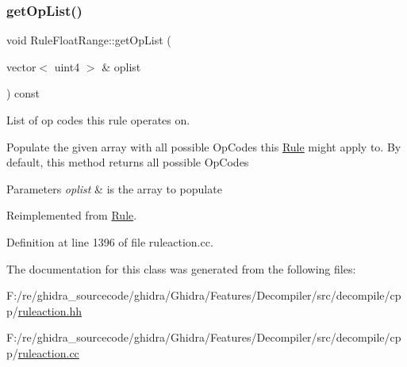 \subsubsection{\texorpdfstring{getOpList()}{getOpList()}}
{\footnotesize\ttfamily void Rule\+Float\+Range\+::get\+Op\+List (\begin{DoxyParamCaption}\item[{vector$<$ uint4 $>$ \&}]{oplist }\end{DoxyParamCaption}) const\hspace{0.3cm}{\ttfamily [virtual]}}



List of op codes this rule operates on. 

Populate the given array with all possible Op\+Codes this \mbox{\hyperlink{class_rule}{Rule}} might apply to. By default, this method returns all possible Op\+Codes 
\begin{DoxyParams}{Parameters}
{\em oplist} & is the array to populate \\
\hline
\end{DoxyParams}


Reimplemented from \mbox{\hyperlink{class_rule_a4023bfc7825de0ab866790551856d10e}{Rule}}.



Definition at line 1396 of file ruleaction.\+cc.



The documentation for this class was generated from the following files\+:\begin{DoxyCompactItemize}
\item 
F\+:/re/ghidra\+\_\+sourcecode/ghidra/\+Ghidra/\+Features/\+Decompiler/src/decompile/cpp/\mbox{\hyperlink{ruleaction_8hh}{ruleaction.\+hh}}\item 
F\+:/re/ghidra\+\_\+sourcecode/ghidra/\+Ghidra/\+Features/\+Decompiler/src/decompile/cpp/\mbox{\hyperlink{ruleaction_8cc}{ruleaction.\+cc}}\end{DoxyCompactItemize}
